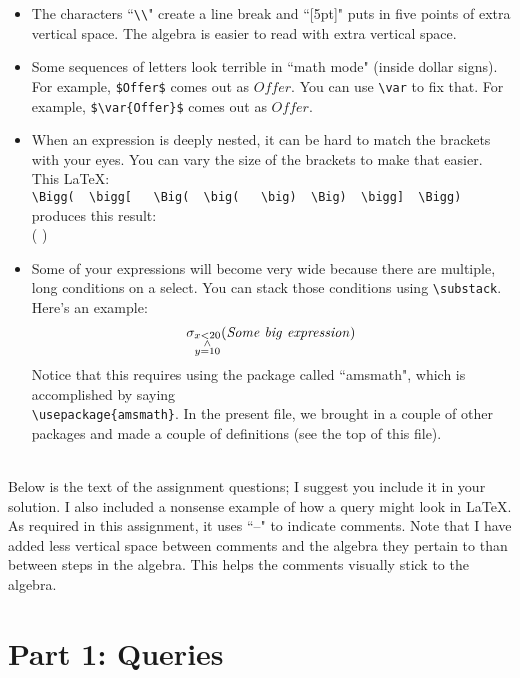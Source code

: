 \documentclass{article}
\newcommand{\var}[1]{\mathit{#1}}
\begin{document}
\begin{itemize}
\item The characters ``\verb|\\|" create a line break and ``[5pt]" puts in 
five points of extra vertical space.  The algebra is easier to read with extra
vertical space.
\item Some sequences of letters look terrible in ``math mode" (inside dollar signs).
For example, \verb|$Offer$| comes out as $Offer$.
You can use \verb|\var| to fix that.
For example, \verb|$\var{Offer}$| comes out as $\var{Offer}$.
\item When an expression is deeply nested, it can be hard to match the brackets with your eyes.
You can vary the size of the brackets to make that easier.
This LaTeX: \\[5pt]
\hspace*{1cm} \verb+\Bigg(  \bigg[   \Big(  \big(   \big)  \Big)  \bigg]  \Bigg)+ \\[5pt]
produces this result: \\[5pt]
\hspace*{1cm}  \Bigg( \bigg[ \Big( \big(  \big) \Big) \bigg] \Bigg)
\item 
Some of your expressions will become very wide because there are multiple, long
conditions on a select.
You can stack those conditions using \verb|\substack|.
Here's an example:
$$
\sigma_{\substack{x < 20 \\ \wedge \\ y = 10}} (\var{Some~big~expression}) \\[5pt]
$$
Notice that this requires using the package called ``amsmath", which is accomplished by saying\\
\verb|\usepackage{amsmath}|.
In the present file, we brought in a couple of other packages and made a couple of definitions
(see the top of this file).
\end{itemize}

{~}\\
Below is the text of the assignment questions; I suggest you include it in your solution.
I also included a nonsense example of how a query might look in LaTeX.  
As required in this assignment, it uses ``--" to indicate comments.
Note that I have added less vertical space between comments
and the algebra they pertain to than between steps in the algebra.
This helps the comments visually stick to the algebra.

\section*{Part 1: Queries}
\end{document}
